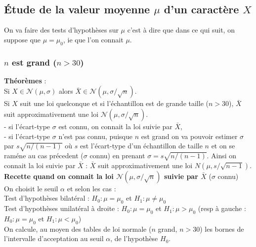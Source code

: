 \documentclass[a4paper,11pt]{book}
\begin{document}
\subsection{\'Etude de la valeur moyenne $\mu$ d'un caract\`ere $X$}
On va faire des tests d'hypoth\`eses sur $\mu$ c'est \`a dire que dans ce qui 
suit, on suppose que $\mu=\mu_0$, ie que l'on connait $\mu$. 
\subsubsection{$n$ est grand ($n > 30$)}
{\bf Th\'eor\`emes} :\\
Si $X \in \mathcal N(\mu,\sigma)$ alors 
$\bar X\in \mathcal N(\mu,\sigma/\sqrt n)$. \\
Si $X$ suit une loi quelconque et si l'\'echantillon est de grande taille 
($n>30$), $\bar X$ suit approximativement une loi $\mathcal N(\mu,\sigma/\sqrt n)$.\\  
- si l'\'ecart-type $\sigma$ est connu, on connait la loi suivie par $\bar X$,\\
- si l'\'ecart-type $\sigma$ n'est pas connu, puisque $n$ est grand on va 
pouvoir estimer $\sigma$ par $s\sqrt{n/(n-1)}$ o\`u $s$ 
est l'\'ecart-type  d'un \'echantillon de taille $n$ et on se ram\'ene 
au cas pr\'ecedent ($\sigma$ connu) en prenant $\sigma=s\sqrt{n/(n-1)}$.
Ainsi on connait la loi suivie par $\bar X$ : $\bar X$ suit approximativement 
une loi $N(\mu,s/\sqrt {n-1})$.\\ 
{\bf Recette quand on connait la loi $\mathcal N(\mu,\sigma/\sqrt n)$ 
suivie par $\bar X$} ($\sigma$ connu)\\ 
On choisit le seuil $\alpha$ et selon les cas :\\
Test d'hypoth\`eses bilat\'eral : $H_0 :\mu =\mu_0$  et  $H_1:\mu\neq \mu_0$\\
Test d'hypoth\`eses unilat\'eral \`a droite : $H_0 :\mu =\mu_0$ et  $H_1:\mu> \mu_0$ (resp \`a gauche : $H_0 :\mu =\mu_0$ et  $H_1:\mu< \mu_0$)\\
On calcule,  au moyen des tables de loi normale ($n$ grand, $n>30$) les bornes 
de l'intervalle d'acceptation au seuil $\alpha$, 
de l'hypoth\`ese $H_0$.
\end{document}

